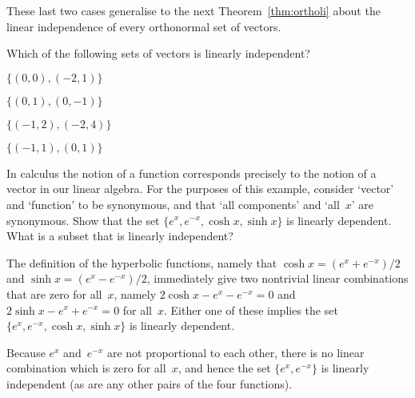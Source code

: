 \begin{example}
\begin{enumerate}
\end{enumerate}
These last two cases generalise to the next Theorem~\ref{thm:ortholi} about the linear independence of every orthonormal set of vectors.
\end{example}



\begin{activity}
Which of the following sets of vectors is linearly independent?
\begin{parts}
\item \(\{(0,0),(-2,1)\}\)
\item \(\{(0,1),(0,-1)\}\)
\item \(\{(-1,2),(-2,4)\}\)
\item \(\{(-1,1),(0,1)\}\)\actans
\end{parts}
\end{activity}



\begin{example} \label{eg:}
In calculus the notion of a function corresponds precisely to the notion of a vector in our linear algebra.  
For the purposes of this example, consider `vector' and `function' to be synonymous, and that `all components' and `all~\(x\)' are synonymous. 
Show that the set \(\{e^x,e^{-x},\cosh x,\sinh x\}\) is linearly dependent.  
What is a subset that is linearly independent?
\begin{solution} 
The definition of the hyperbolic functions, namely that \(\cosh x=(e^x+e^{-x})/2\) and \(\sinh x=(e^x-e^{-x})/2\), immediately give two nontrivial linear combinations that are zero for all~\(x\), namely \(2\cosh x-e^x-e^{-x}=0\) and \(2\sinh x-e^x+e^{-x}=0\) for all~\(x\).
Either one of these implies the set \(\{e^x,e^{-x},\cosh x,\sinh x\}\) is linearly dependent.

Because \(e^x\) and~\(e^{-x}\) are not proportional to each other, there is no linear combination which is zero for all~\(x\), and hence the set \(\{e^x,e^{-x}\}\) is linearly independent (as are any other pairs of the four functions).
\end{solution}
\end{example}






